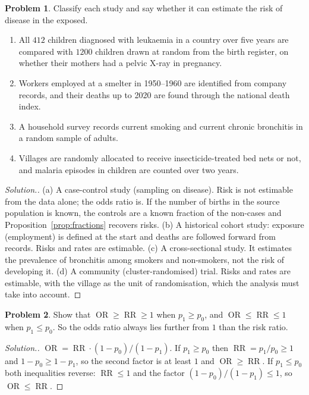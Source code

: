 \documentclass[11pt,a4paper]{article}
\numberwithin{equation}{section}
\DeclareMathOperator{\OR}{OR}
\DeclareMathOperator{\RR}{RR}
\theoremstyle{definition}
\newtheorem{problemx}{Problem}[subsection]
\newenvironment{problem}{\begin{problemx}}{\end{problemx}}
\newenvironment{solution}
  {\renewcommand{\qedsymbol}{}\begin{proof}[\textit{Solution}.]}
  {\end{proof}}
\begin{document}
\begin{problem}
Classify each study and say whether it can estimate the risk of disease in the exposed.
\begin{enumerate}[label=(\alph*)]
\item All $412$ children diagnosed with leukaemia in a country over five years are compared with $1200$ children drawn at random
from the birth register, on whether their mothers had a pelvic X-ray in pregnancy.
\item Workers employed at a smelter in 1950--1960 are identified from company records, and their deaths up to 2020 are found through the
national death index.
\item A household survey records current smoking and current chronic bronchitis in a random sample of adults.
\item Villages are randomly allocated to receive insecticide-treated bed nets or not, and malaria episodes in children are counted over
two years.
\end{enumerate}
\end{problem}

\begin{solution}
(a) A case-control study (sampling on disease). Risk is not estimable from the data alone; the odds ratio is. If the number of births in
the source population is known, the controls are a known fraction of the non-cases and Proposition~\ref{prop:fractions} recovers risks.
(b) A historical cohort study: exposure (employment) is defined at the start and deaths are followed forward from records. Risks and
rates are estimable.
(c) A cross-sectional study. It estimates the prevalence of bronchitis among smokers and non-smokers, not the risk of developing it.
(d) A community (cluster-randomised) trial. Risks and rates are estimable, with the village as the unit of randomisation, which
the analysis must take into account.
\end{solution}

\begin{problem}
\label{prob:orrr}
Show that $\OR \geq \RR \geq 1$ when $p_1 \geq p_0$, and $\OR \leq \RR \leq 1$ when $p_1 \leq p_0$. So the odds ratio always lies further from $1$ than the
risk ratio.
\end{problem}

\begin{solution}
$\OR = \RR \cdot (1 - p_0)/(1 - p_1)$. If $p_1 \geq p_0$ then $\RR = p_1/p_0 \geq 1$ and $1 - p_0 \geq 1 - p_1$, so the second factor is at least $1$ and
$\OR \geq \RR$. If $p_1 \leq p_0$ both inequalities reverse: $\RR \leq 1$ and the factor $(1 - p_0)/(1 - p_1) \leq 1$, so $\OR \leq \RR$.
\end{solution}
\end{document}
